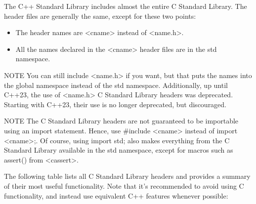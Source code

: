 The C++ Standard Library includes almost the entire C Standard Library. The header files are generally the same, except for these two points:

\begin{itemize}
\item
The header names are <cname> instead of <name.h>.

\item
All the names declared in the <cname> header files are in the std namespace.
\end{itemize}

\begin{myNotic}{NOTE}
You can still include <name.h> if you want, but that puts the names into the global namespace instead of the std namespace. Additionally, up until C++23, the use of <name.h> C Standard Library headers was deprecated. Starting with C++23, their use is no longer deprecated, but discouraged.
\end{myNotic}


\begin{myNotic}{NOTE}
The C Standard Library headers are not guaranteed to be importable using an import statement. Hence, use \#include <cname> instead of import <cname>;. Of course, using import std; also makes everything from the C Standard Library available in the std namespace, except for macros such as assert() from <cassert>.
\end{myNotic}

The following table lists all C Standard Library headers and provides a summary of their most useful functionality. Note that it’s recommended to avoid using C functionality, and instead use equivalent C++ features whenever possible:

